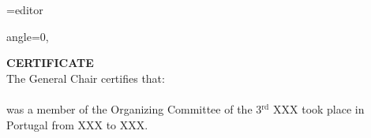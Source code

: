 \documentclass[12pt,a4paper,landscape]{report}
\begin{document}
    \showboxbreadth\maxdimen
    \showboxdepth\maxdimen
    \showoutput
    \linespread{1.3}\selectfont
    \pagestyle{empty}
    {\editor=editor}
    {
    \noindent
                    angle=0,
    \BgThispage
    \vfill
    \begin{center}
       {\Huge\bf CERTIFICATE}\\
        \vfill
    	   \normalfont \LARGE The General Chair certifies that: \\
            \vfill
            {\bf \editor}\\
            \vfill
            was a member of the Organizing Committee of the 3$^{\text{rd}}$ XXX took place in Portugal from XXX to XXX.
            \vfill
    \end{center}
    \vfill
    \clearpage
    \BgThispage
    }
\end{document}
